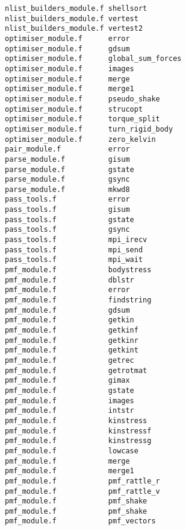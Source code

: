 \begin{verbatim}
nlist_builders_module.f shellsort                 
nlist_builders_module.f vertest                   
nlist_builders_module.f vertest2                  
optimiser_module.f      error                     
optimiser_module.f      gdsum                     
optimiser_module.f      global_sum_forces         
optimiser_module.f      images                    
optimiser_module.f      merge                     
optimiser_module.f      merge1                    
optimiser_module.f      pseudo_shake              
optimiser_module.f      strucopt                  
optimiser_module.f      torque_split              
optimiser_module.f      turn_rigid_body           
optimiser_module.f      zero_kelvin               
pair_module.f           error                     
parse_module.f          gisum                     
parse_module.f          gstate                    
parse_module.f          gsync                     
parse_module.f          mkwd8                     
pass_tools.f            error                     
pass_tools.f            gisum                     
pass_tools.f            gstate                    
pass_tools.f            gsync                     
pass_tools.f            mpi_irecv                 
pass_tools.f            mpi_send                  
pass_tools.f            mpi_wait                  
pmf_module.f            bodystress                
pmf_module.f            dblstr                    
pmf_module.f            error                     
pmf_module.f            findstring            
pmf_module.f            gdsum                     
pmf_module.f            getkin                    
pmf_module.f            getkinf                   
pmf_module.f            getkinr                   
pmf_module.f            getkint                   
pmf_module.f            getrec                    
pmf_module.f            getrotmat                 
pmf_module.f            gimax                     
pmf_module.f            gstate                    
pmf_module.f            images                    
pmf_module.f            intstr                    
pmf_module.f            kinstress                 
pmf_module.f            kinstressf                
pmf_module.f            kinstressg                
pmf_module.f            lowcase                   
pmf_module.f            merge                     
pmf_module.f            merge1                    
pmf_module.f            pmf_rattle_r              
pmf_module.f            pmf_rattle_v              
pmf_module.f            pmf_shake                 
pmf_module.f            pmf_shake                 
pmf_module.f            pmf_vectors               

\end{verbatim}
